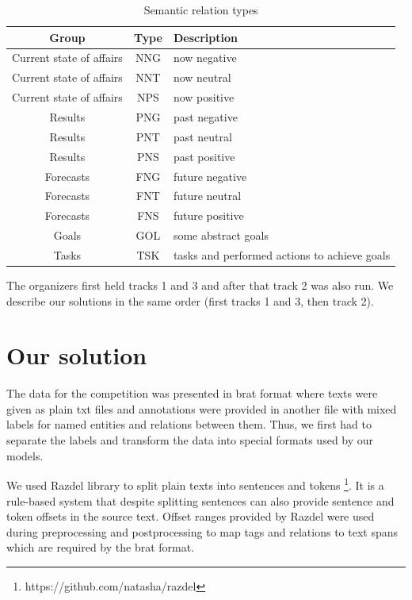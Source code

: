 \documentclass{dialogue}
\begin{document}
	\begin{table}[bth]
		\centering
		\small
		\begin{tabular}{c|c|p{8cm}}
			\hline
			Group & Type & Description\\ \hline
			Current state of affairs & NNG & now negative \\ \hline
			Current state of affairs & NNT & now neutral \\ \hline
			Current state of affairs & NPS & now positive \\ \hline\hline
			
			Results & PNG & past negative\\ \hline
			Results & PNT & past neutral\\ \hline
			Results & PNS & past positive\\ \hline\hline
			
			Forecasts & FNG & future negative\\ \hline
			Forecasts & FNT & future neutral\\ \hline
			Forecasts & FNS & future positive\\ \hline\hline
			
			Goals & GOL & some abstract goals\\ \hline
			Tasks & TSK & tasks and performed actions to achieve goals\\ \hline
			
		\end{tabular}
		\caption{Semantic relation types}
		\label{tab:rel}
	\end{table}
	
	The organizers first held tracks 1 and 3 and after that track 2 was also run. We describe our solutions in the same order (first tracks 1 and 3, then track 2).
	\section{Our solution}
	The data for the competition was presented in brat format \cite{brat} where texts were given as plain txt files and annotations were provided in another file with mixed labels for named entities and relations between them. Thus, we first had to separate the labels and transform the data into special formats used by our models.
	
	We used Razdel library to split plain texts into sentences and tokens \footnote{https://github.com/natasha/razdel}. It is a rule-based system that despite splitting sentences can also provide sentence and token offsets in the source text. Offset ranges provided by Razdel were used during preprocessing and postprocessing to map tags and relations to text spans which are required by the brat format.
	
\end{document}
